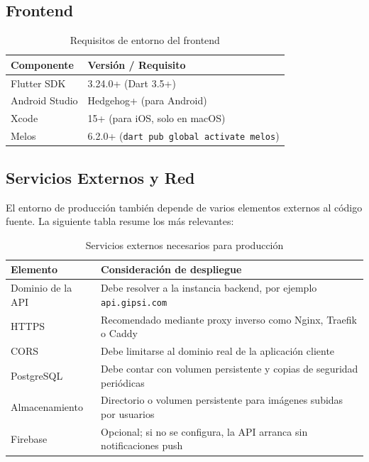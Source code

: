 \documentclass[12pt,a4paper,twoside]{report}
\begin{document}
\subsection{Frontend}

\begin{table}[H]
\centering
\caption{Requisitos de entorno del frontend}
\label{tab:req-frontend}
\begin{tabular}{ll}
\toprule
Componente & Versión / Requisito \\
\midrule
Flutter SDK & 3.24.0+ (Dart 3.5+) \\
Android Studio & Hedgehog+ (para Android) \\
Xcode & 15+ (para iOS, solo en macOS) \\
Melos & 6.2.0+ (\texttt{dart pub global activate melos}) \\
\bottomrule
\end{tabular}
\end{table}

\subsection{Servicios Externos y Red}

El entorno de producción también depende de varios elementos externos al código
fuente. La siguiente tabla resume los más relevantes:

\begin{table}[H]
\centering
\caption{Servicios externos necesarios para producción}
\label{tab:req-servicios-produccion}
\begin{tabularx}{\textwidth}{l>{\raggedright\arraybackslash}X}
\toprule
Elemento & Consideración de despliegue \\
\midrule
Dominio de la API & Debe resolver a la instancia backend, por ejemplo \texttt{api.gipsi.com} \\
HTTPS & Recomendado mediante proxy inverso como Nginx, Traefik o Caddy \\
CORS & Debe limitarse al dominio real de la aplicación cliente \\
PostgreSQL & Debe contar con volumen persistente y copias de seguridad periódicas \\
Almacenamiento & Directorio o volumen persistente para imágenes subidas por usuarios \\
Firebase & Opcional; si no se configura, la API arranca sin notificaciones push \\
\bottomrule
\end{tabularx}
\end{table}
\end{document}
